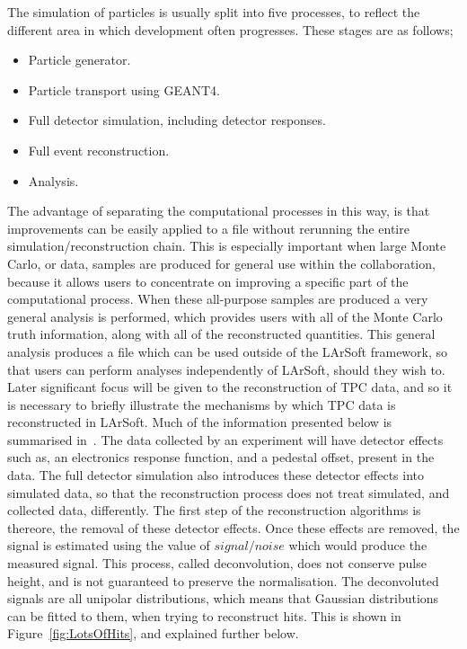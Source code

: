 The simulation of particles is usually split into five processes, to reflect the different area in which development often progresses. These stages are as follows;
\begin{itemize}
\item Particle generator.
\item Particle transport using GEANT4.
\item Full detector simulation, including detector responses. 
\item Full event reconstruction.
\item Analysis.
\end{itemize}
The advantage of separating the computational processes in this way, is that improvements can be easily applied to a file without rerunning the entire simulation/reconstruction chain. This is especially important when large Monte Carlo, or data, samples are produced for general use within the collaboration, because it allows users to concentrate on improving a specific part of the computational process. When these all-purpose samples are produced a very general analysis is performed, which provides users with all of the Monte Carlo truth information, along with all of the reconstructed quantities. This general analysis produces a file which can be used outside of the LArSoft framework, so that users can perform analyses independently of LArSoft, should they wish to. \\

Later significant focus will be given to the reconstruction of TPC data, and so it is necessary to briefly illustrate the mechanisms by which TPC data is reconstructed in LArSoft. Much of the information presented below is summarised in~\citep{LArSoftOrg, LArSoftRecoNote}. The data collected by an experiment will have detector effects such as, an electronics response function, and a pedestal offset, present in the data. The full detector simulation also introduces these detector effects into simulated data, so that the reconstruction process does not treat simulated, and collected data, differently. The first step of the reconstruction algorithms is thereore, the removal of these detector effects. Once these effects are removed, the signal is estimated using the value of $signal/noise$ which would produce the measured signal. This process, called deconvolution, does not conserve pulse height, and is not guaranteed to preserve the normalisation. The deconvoluted signals are all unipolar distributions, which means that Gaussian distributions can be fitted to them, when trying to reconstruct hits. This is shown in Figure~\ref{fig:LotsOfHits}, and explained further below.\\

